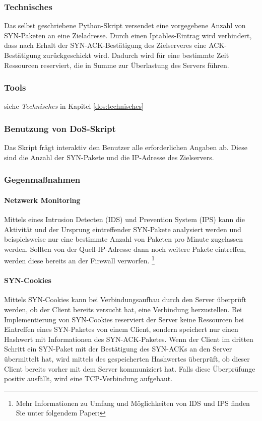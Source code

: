 \subsubsection*{Technisches}
\label{dos:technisches}
Das selbst geschriebene Python-Skript versendet eine vorgegebene Anzahl von SYN-Paketen an eine Zieladresse. Durch einen Iptables-Eintrag wird verhindert, dass nach Erhalt der SYN-ACK-Bestätigung
des Zielserveres eine ACK-Bestätigung zurückgeschickt wird. Dadurch wird für eine bestimmte Zeit Ressourcen reserviert, die in Summe zur Überlastung des Servers führen.

\subsubsection*{Tools}
siehe \textit{Technisches} in Kapitel \ref{dos:technisches}

\subsubsection*{Benutzung von DoS-Skript}
Das Skript frägt interaktiv den Benutzer alle erforderlichen Angaben ab. Diese sind die Anzahl der SYN-Pakete und die IP-Adresse des Zielservers.

\subsubsection*{Gegenmaßnahmen}

\paragraph*{Netzwerk Monitoring}
Mittels eines Intrusion Detecten (IDS) und Prevention System (IPS) kann die Aktivität und der Ursprung eintreffender SYN-Pakete analysiert werden und beispielsweise nur eine bestimmte Anzahl von Paketen pro
Minute zugelassen werden. Sollten von der Quell-IP-Adresse dann noch weitere Pakete eintreffen, werden diese bereits an der Firewall verworfen. \footnote{Mehr Informationen zu Umfang und Möglichkeiten von IDS und IPS finden Sie unter folgendem Paper:\cite{differenceipsids}} 

\paragraph*{SYN-Cookies}
Mittels SYN-Cookies kann bei Verbindungsaufbau durch den Server überprüft werden, ob der Client bereits versucht hat, eine Verbindung herzustellen. Bei Implementierung von SYN-Cookies reserviert der Server keine Ressourcen bei Eintreffen eines SYN-Paketes von einem Client, sondern speichert nur einen Hashwert mit Informationen des SYN-ACK-Paketes. Wenn der Client im dritten Schritt ein SYN-Paket mit der Bestätigung des SYN-ACKs an den Server übermittelt hat, wird mittels des gespeicherten Hashwertes überprüft, ob dieser Client bereits vorher mit dem Server kommuniziert hat. Falls diese Überprüfunge positiv ausfällt, wird eine TCP-Verbindung aufgebaut.\newpage


